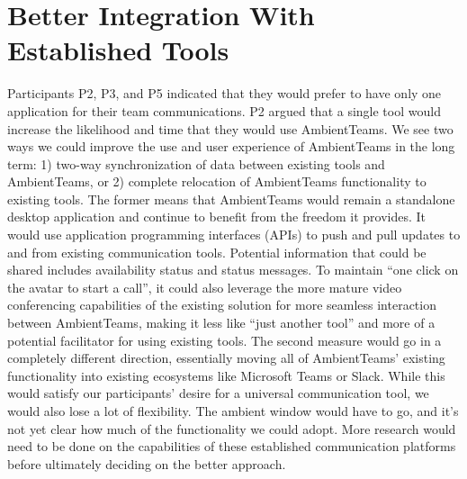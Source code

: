 \section{Better Integration With Established Tools}
\label{section:better_integration_with_established_tools}
Participants P2, P3, and P5 indicated that they would prefer to have only one application for their team communications. P2 argued that a single tool would increase the likelihood and time that they would use AmbientTeams. We see two ways we could improve the use and user experience of AmbientTeams in the long term: 1) two-way synchronization of data between existing tools and AmbientTeams, or 2) complete relocation of AmbientTeams functionality to existing tools. The former means that AmbientTeams would remain a standalone desktop application and continue to benefit from the freedom it provides. It would use application programming interfaces (APIs) to push and pull updates to and from existing communication tools. Potential information that could be shared includes availability status and status messages. To maintain \enquote{one click on the avatar to start a call}, it could also leverage the more mature video conferencing capabilities of the existing solution for more seamless interaction between AmbientTeams, making it less like \enquote{just another tool} and more of a potential facilitator for using existing tools. The second measure would go in a completely different direction, essentially moving all of AmbientTeams' existing functionality into existing ecosystems like Microsoft Teams or Slack. While this would satisfy our participants' desire for a universal communication tool, we would also lose a lot of flexibility. The ambient window would have to go, and it's not yet clear how much of the functionality we could adopt. More research would need to be done on the capabilities of these established communication platforms before ultimately deciding on the better approach.

